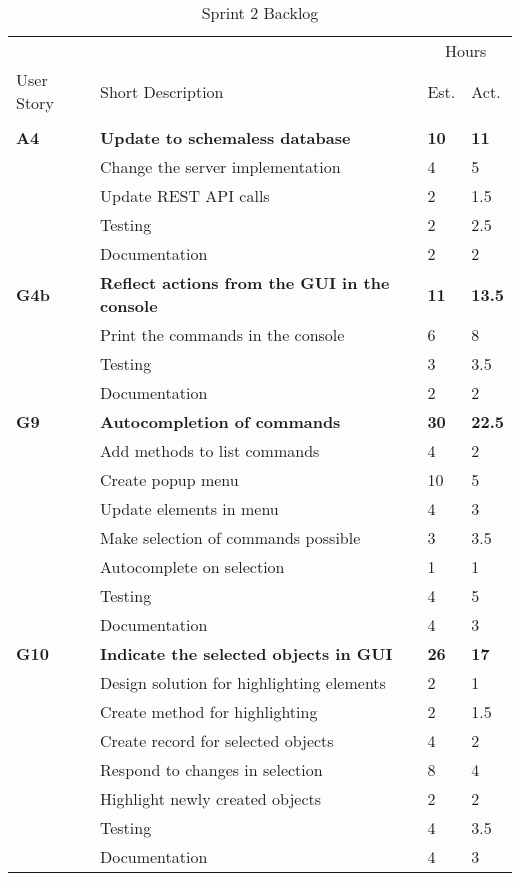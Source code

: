 \begin{table}
\caption{Sprint 2 Backlog}
\centering
\begin{tabular}{ l p{8cm} l l }
\hline 
			&				&\multicolumn{2}{c}{Hours}			\\
 User Story	& Short Description		&Est.		&Act.	                               \\ 
\hline \\ [-2.0ex]
 \bf{A4}     &\bf{Update to schemaless database}		&\bf{10}		&\bf{11}          \\ 
		  &Change the server implementation		&4			&5		\\
		  &Update REST API calls					&2			&1.5		\\
		  &Testing							&2			&2.5		\\
		  &Documentation						&2			&2		\\

 \bf{G4b}     &\bf{Reflect actions from the GUI in the console} 		&\bf{11}		&\bf{13.5}               \\ 
		  &Print the commands in the console				&6			&8		\\
		  &Testing									&3			&3.5		\\
		  &Documentation								&2			&2		\\

 \bf{G9}     &\bf{Autocompletion of commands} 	&\bf{30}		&\bf{22.5}		     \\ 
		  &Add methods to list commands		&4			&2		\\
		  &Create popup menu				&10			&5		\\
		  &Update elements in menu			&4			&3		\\
		  &Make selection of commands possible&3			&3.5		\\
		  &Autocomplete on selection			&1			&1		\\
		  &Testing						&4			&5		\\
		  &Documentation					&4			&3		\\

 \bf{G10}   &\bf{Indicate the selected objects in GUI}		&\bf{26}		&\bf{17}		     \\ 
		  &Design solution for highlighting elements	&2			&1		\\
		  &Create method for highlighting				&2			&1.5		\\
		  &Create record for selected objects			&4			&2		\\
		  &Respond to changes in selection				&8			&4		\\
		  &Highlight newly created objects				&2			&2		\\
		  &Testing								&4			&3.5		\\
		  &Documentation							&4			&3		\\


\end{tabular}
\end{table}

